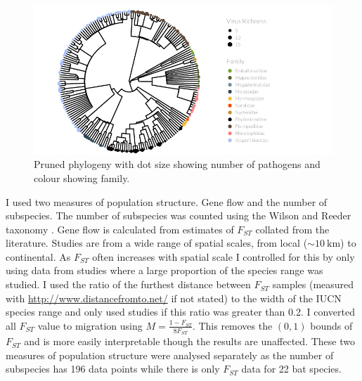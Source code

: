 \begin{knitrout}\footnotesize
{}\color{fgcolor}\begin{figure}[t]

{\centering \includegraphics[width=\textwidth]{figure/treePlot-1} 

}

\caption[Pruned phylogeny with dot size showing number of pathogens and colour showing family]{Pruned phylogeny with dot size showing number of pathogens and colour showing family.}\label{fig:treePlot}
\end{figure}


\end{knitrout}










I used two measures of population structure. 
Gene flow and the number of subspecies.
The number of subspecies was counted using the Wilson and Reeder taxonomy \cite{wilson2005mammal}.
Gene flow is calculated from estimates of $F_{ST}$ collated from the literature.
Studies are from a wide range of spatial scales, from local ($\sim\SI{10}{\kilo\metre}$) to continental.
As $F_{ST}$ often increases with spatial scale \cite{burland1999population, hulva2010mechanisms, o2015genetic, vonhof2015range} I controlled for this by only using data from studies where a large proportion of the species range was studied.
I used the ratio of the furthest distance between $F_{ST}$ samples (measured with \url{http://www.distancefromto.net/} if not stated) to the width of the IUCN species range \cite{iucn} and only used studies if this ratio was greater than 0.2.
I converted all $F_{ST}$ value to migration using $M = \frac{1-F_{ST}}{8F_{ST}}$.
This removes the $(0, 1)$ bounds of $F_{ST}$ and is more easily interpretable though the results are unaffected. 
These two measures of population structure were analysed separately as the number of subspecies has 196 data points while there is only $F_{ST}$ data for 22 bat species.

